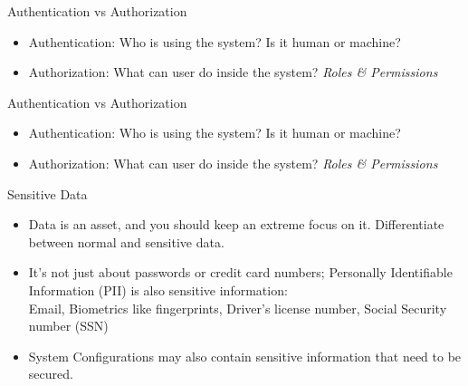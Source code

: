 \documentclass{beamer}
\begin{document}
\begin{frame}[t]{Authentication vs Authorization}
  \begin{itemize}
  	\small
    \item Authentication: Who is using the system? Is it human or machine?
    \item Authorization: What can user do inside the system? \textit{Roles \& Permissions}
  \end{itemize}
\end{frame}

\begin{frame}[t]{Authentication vs Authorization}
  \begin{itemize}
  	\small
    \item Authentication: Who is using the system? Is it human or machine?
    \item Authorization: What can user do inside the system? \textit{Roles \& Permissions}
  \end{itemize}
  
  \begin{block}{Sensitive Data}
    \scriptsize
    \begin{itemize}
		\item Data is an asset, and you should keep an extreme focus on it. Differentiate between normal and sensitive data. 
		\item It's not just about passwords or credit card numbers; Personally Identifiable Information (PII) is also sensitive information: \\ 
  			Email, Biometrics like fingerprints, Driver's license number, Social Security number (SSN) \\
  	
  		\item System Configurations may also contain sensitive information that need to be secured.
  	\end{itemize}
  \end{block}
  
\end{frame}
\end{document}
